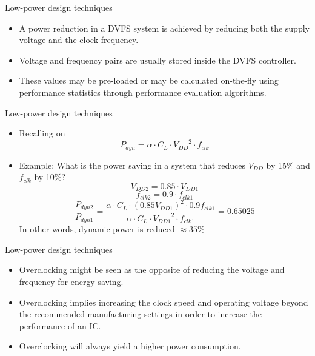 \documentclass[]{slides}
\begin{document}
\begin{frame}{Low-power design techniques}{}
\begin{itemize}
\item A power reduction in a \ac{DVFS} system is achieved by reducing both the supply voltage and the clock frequency.
\item Voltage and frequency pairs are usually stored inside the \ac{DVFS} controller.
\item These values may be pre-loaded or may be calculated on-the-fly using performance statistics through performance evaluation algorithms.
\end{itemize}
\end{frame}

\begin{frame}{Low-power design techniques}{}
\begin{itemize}
\item Recalling on 
\begin{equation*}
P_{dyn} = \alpha \cdot C_{L} \cdot {V_{DD}}^{2} \cdot f_{clk}
\end{equation*}
\item Example: What is the power saving in a system that reduces $V_{DD}$ by 15\% and $f_{clk}$ by 10\%?
\pause
\begin{equation*}
V_{DD2}=0.85 \cdot V_{DD1}
\end{equation*}
\begin{equation*}
f_{clk2}=0.9 \cdot f_{clk1}
\end{equation*}
\pause
\begin{equation*}
\frac{P_{dyn2}}{P_{dyn1}} = \frac{\alpha \cdot C_{L} \cdot {(0.85V_{DD1})}^{2} \cdot 0.9f_{clk1}}{\alpha \cdot C_{L} \cdot {V_{DD1}}^{2} \cdot f_{clk1}} = 0.65025
\end{equation*}
In other words, dynamic power is reduced $\approx 35\%$ 
\end{itemize}
\end{frame}

\begin{frame}{Low-power design techniques}{}
\begin{itemize}
\item Overclocking might be seen as the opposite of reducing the voltage and frequency for energy saving.
\item Overclocking implies increasing the clock speed and operating voltage beyond the recommended manufacturing settings in order to increase the performance of an \ac{IC}.
\item Overclocking will always yield a higher power consumption.

\end{itemize}
\end{frame}
\end{document}
